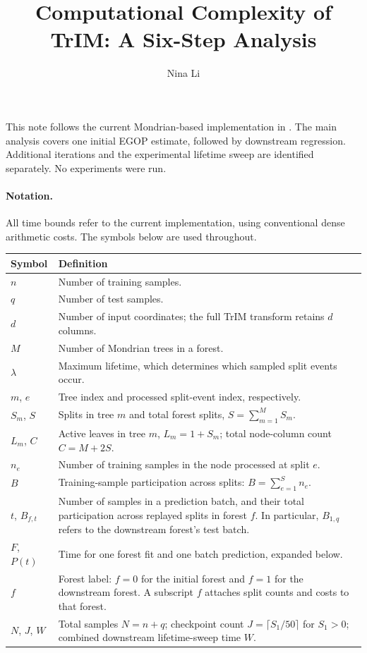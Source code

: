 \documentclass[11pt]{article}
\title{Computational Complexity of TrIM: A Six-Step Analysis}
\author{Nina Li}
\date{}
\newcommand{\code}[1]{\texttt{\detokenize{#1}}}
\begin{document}
\maketitle

\noindent This note follows the current Mondrian-based implementation in
\code{estimatedH_CSS/src/}. The main analysis covers one initial EGOP estimate,
followed by downstream regression. Additional iterations and the experimental
lifetime sweep are identified separately. No experiments were run.

\paragraph{Notation.}
All time bounds refer to the current implementation, using conventional dense
arithmetic costs. The symbols below are used throughout.
\begin{center}
\small
\begin{tabularx}{\textwidth}{lY}
\toprule
Symbol & Definition \\
\midrule
$n$ & Number of training samples. \\
$q$ & Number of test samples. \\
$d$ & Number of input coordinates; the full TrIM transform retains $d$ columns. \\
$M$ & Number of Mondrian trees in a forest. \\
$\lambda$ & Maximum lifetime, which determines which sampled split events occur. \\
$m$, $e$ & Tree index and processed split-event index, respectively. \\
$S_m$, $S$ & Splits in tree $m$ and total forest splits, $S=\sum_{m=1}^{M}S_m$. \\
$L_m$, $C$ & Active leaves in tree $m$, $L_m=1+S_m$; total node-column count $C=M+2S$. \\
$n_e$ & Number of training samples in the node processed at split $e$. \\
$B$ & Training-sample participation across splits: $B=\sum_{e=1}^{S}n_e$. \\
$t$, $B_{f,t}$ & Number of samples in a prediction batch, and their total participation across replayed splits in forest $f$. In particular, $B_{1,q}$ refers to the downstream forest's test batch. \\
$F$, $P(t)$ & Time for one forest fit and one batch prediction, expanded below. \\
$f$ & Forest label: $f=0$ for the initial forest and $f=1$ for the downstream forest. A subscript $f$ attaches split counts and costs to that forest. \\
$N$, $J$, $W$ & Total samples $N=n+q$; checkpoint count $J=\lceil S_1/50\rceil$ for $S_1>0$; combined downstream lifetime-sweep time $W$. \\
\bottomrule
\end{tabularx}
\end{center}
\end{document}
